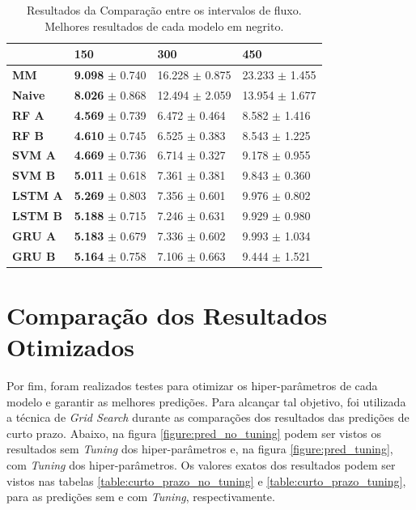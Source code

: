\begin{table}[H]
    \begin{tabular*}{\linewidth}{@{\extracolsep{\fill}}llll}
    \toprule
     & 
    \multicolumn{1}{l}{\textbf{150}} & 
    \multicolumn{1}{l}{\textbf{300}} &
    \multicolumn{1}{l}{\textbf{450}} \\
    \midrule
    \textbf{MM} & \textbf{9.098} $\pm$ 0.740 & 16.228 $\pm$ 0.875 & 23.233 $\pm$ 1.455
    \\
    \midrule
    \textbf{Naive} & \textbf{8.026} $\pm$ 0.868 & 12.494 $\pm$ 2.059 & 13.954 $\pm$ 1.677
    \\
    \midrule
    \textbf{RF A} & \textbf{4.569} $\pm$ 0.739 & 6.472 $\pm$ 0.464 & 8.582 $\pm$ 1.416
    \\
    \midrule
    \textbf{RF B} & \textbf{4.610} $\pm$ 0.745 & 6.525 $\pm$ 0.383 & 8.543 $\pm$ 1.225
    \\
    \midrule
    \textbf{SVM A} & \textbf{4.669} $\pm$ 0.736 & 6.714 $\pm$ 0.327 & 9.178 $\pm$ 0.955
    \\
    \midrule
    \textbf{SVM B} & \textbf{5.011} $\pm$ 0.618 & 7.361 $\pm$ 0.381 & 9.843 $\pm$ 0.360
    \\
    \midrule
    \textbf{LSTM A} & \textbf{5.269} $\pm$ 0.803 & 7.356 $\pm$ 0.601 & 9.976 $\pm$ 0.802
    \\
    \midrule
    \textbf{LSTM B} & \textbf{5.188} $\pm$ 0.715 & 7.246 $\pm$ 0.631 & 9.929 $\pm$ 0.980
    \\
    \midrule
    \textbf{GRU A} & \textbf{5.183} $\pm$ 0.679 & 7.336 $\pm$ 0.602 & 9.993 $\pm$ 1.034
    \\
    \midrule
    \textbf{GRU B} & \textbf{5.164} $\pm$ 0.758 & 7.106 $\pm$ 0.663 & 9.444 $\pm$ 1.521
    \\
    \bottomrule
    \end{tabular*}
    \label{table:res_flow}
    \caption{Resultados da Comparação entre os intervalos de fluxo. Melhores resultados de cada modelo em negrito.}
\end{table}

\section{Comparação dos Resultados Otimizados}

 Por fim, foram realizados testes para otimizar os hiper-parâmetros de cada modelo e garantir as melhores predições. Para alcançar tal objetivo, foi utilizada a técnica de \textit{Grid Search} durante as comparações dos resultados das predições de curto prazo. Abaixo, na figura \ref{figure:pred_no_tuning} podem ser vistos os resultados sem \textit{Tuning} dos hiper-parâmetros e, na figura \ref{figure:pred_tuning}, com \textit{Tuning} dos hiper-parâmetros. Os valores exatos dos resultados podem ser vistos nas tabelas  \ref{table:curto_prazo_no_tuning} e \ref{table:curto_prazo_tuning}, para as predições sem e com \textit{Tuning}, respectivamente.
 
